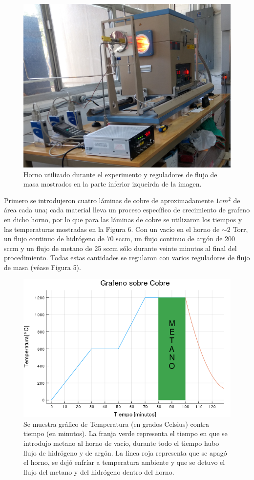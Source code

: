 \documentclass[twocolumn,letterpaper,aps,pra,10pt]{revtex4-1}
\begin{document}
\begin{figure}[h]
\centering
\includegraphics[scale=0.05]{Horno.jpg}
\caption{Horno utilizado durante el experimento y reguladores de flujo de masa mostrados en la parte inferior izqueirda de la imagen.}
\end{figure}

Primero se introdujeron cuatro láminas de cobre de aproximadamente $1 cm^{2}$ de área cada una; cada material lleva un proceso específico de crecimiento de grafeno en dicho horno, por lo que para las láminas de cobre se utilizaron los tiempos y las temperaturas mostradas en la Figura 6. Con un vacío en el horno de $\sim$2 Torr, un flujo continuo de hidrógeno de 70 sccm, un flujo continuo de argón de 200 sccm y un flujo de metano de 25 sccm sólo durante veinte minutos al final del procedimiento. Todas estas cantidades se regularon con varios reguladores de flujo de masa (véase Figura 5).

\begin{figure}[h]
\centering
\includegraphics[scale=0.3]{Grafeno_Cobre.png}
\caption{Se muestra gráfico de Temperatura (en grados Celsius) contra tiempo (en minutos). La franja verde representa el tiempo en que se introdujo metano al horno de vacío, durante todo el tiempo hubo flujo de hidrógeno y de argón. La línea roja representa que se apagó el horno, se dejó enfríar a temperatura ambiente y que se detuvo el flujo del metano y del hidrógeno dentro del horno.}
\end{figure}
\end{document}
